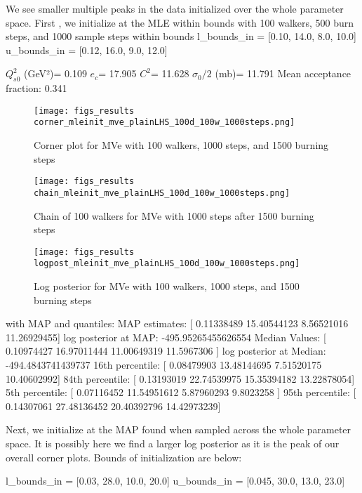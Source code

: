 \documentclass{article}
\begin{document}
We see smaller multiple peaks in the data initialized over the whole parameter space. First , we initialize at the MLE within bounds with 100 walkers, 500 burn steps, and 1000 sample steps within bounds
l_bounds_in = [0.10, 14.0, 8.0, 10.0]
u_bounds_in = [0.12, 16.0, 9.0, 12.0]


$Q_{s0}^{2}$ (GeV²)= 0.109
$e_c$= 17.905
$C^{2}$= 11.628
$\sigma_0/2$ (mb)= 11.791
Mean acceptance fraction: 0.341

\begin{figure}
    \centering
    \texttt{[image: figs\_results\\corner\_mleinit\_mve\_plainLHS\_100d\_100w\_1000steps.png]}
    \label{fig:corner_mve_plainLHS_100d_100w_1000steps}
    \caption{Corner plot for MVe with 100 walkers, 1000 steps, and 1500 burning steps}
    \end{figure}
    
\begin{figure}
    \centering
    \texttt{[image: figs\_results\\chain\_mleinit\_mve\_plainLHS\_100d\_100w\_1000steps.png]}
    \label{fig:chain_mve_plainLHS_100d_100w_1000steps}
    \caption{Chain of 100 walkers for MVe with 1000 steps after 1500 burning steps}
    \end{figure}
    
\begin{figure}
    \centering
    \texttt{[image: figs\_results\\logpost\_mleinit\_mve\_plainLHS\_100d\_100w\_1000steps.png]}
    \label{fig:logpost_mve_plainLHS_100d_100w_1000steps}
    \caption{Log posterior for MVe with 100 walkers, 1000 steps, and 1500 burning steps}
    \end{figure}

with MAP and quantiles:
MAP estimates:  [ 0.11338489 15.40544123  8.56521016 11.26929455]
log posterior at MAP:  -495.95265455626554
Median Values:  [ 0.10974427 16.97011444 11.00649319 11.5967306 ]
log posterior at Median:  -494.4843741439737
16th percentile:  [ 0.08479903 13.48144695  7.51520175 10.40602992]
84th percentile:  [ 0.13193019 22.74539975 15.35394182 13.22878054]
5th percentile:  [ 0.07116452 11.54951612  5.87960293  9.8023258 ]
95th percentile:  [ 0.14307061 27.48136452 20.40392796 14.42973239]

Next, we initialize at the MAP found when sampled across the whole parameter space. It is possibly here we find a larger log posterior as it is the peak of our overall corner plots. Bounds of initialization are below:

l_bounds_in = [0.03, 28.0, 10.0, 20.0]
u_bounds_in = [0.045, 30.0, 13.0, 23.0]
\end{document}
